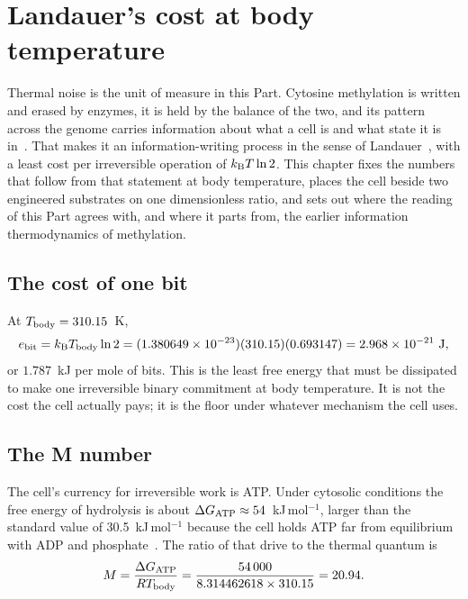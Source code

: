 \chapter{Landauer's cost at body temperature}\label{ch:landauer}

Thermal noise is the unit of measure in this Part. Cytosine methylation is written and erased by enzymes, it is held by the balance of the two, and its pattern
across the genome carries information about what a cell is and what state it is in~\cite{Sanchez2016}. That makes it an information-writing process in
the sense of Landauer~\cite{Landauer1961}, with a least cost per irreversible operation of $k_{\mathrm B} T\ln2$. This chapter fixes the numbers that follow from
that statement at body temperature, places the cell beside two engineered substrates on one dimensionless ratio, and sets out where the
reading of this Part agrees with, and where it parts from, the earlier information thermodynamics of methylation.

\section{The cost of one bit}

At $T_{\mathrm{body}}=310.15$~K,
\begin{equation}
  e_{\mathrm{bit}}=k_{\mathrm B}T_{\mathrm{body}}\ln2=(1.380649\times10^{-23})(310.15)(0.693147)
  =2.968\times10^{-21}\ \mathrm{J},
  \label{eq:ebit}
\end{equation}
or $1.787$~kJ per mole of bits. \calc{} This is the least free energy that must be dissipated to
make one irreversible binary commitment at body temperature. It is not the cost the cell actually
pays; it is the floor under whatever mechanism the cell uses.

\section{The M number}

The cell's currency for irreversible work is ATP. Under cytosolic conditions the free energy of
hydrolysis is about $\Delta G_{\mathrm{ATP}}\approx54$~kJ\,mol$^{-1}$, larger than the standard value of
30.5~kJ\,mol$^{-1}$ because the cell holds ATP far from equilibrium with ADP and
phosphate~\cite{Nelson2017}. The ratio of that drive to the thermal quantum is
\begin{equation}
  M=\frac{\Delta G_{\mathrm{ATP}}}{RT_{\mathrm{body}}}=\frac{54\,000}{8.314462618\times310.15}=20.94 .
  \label{eq:M}
\end{equation}
\calc

